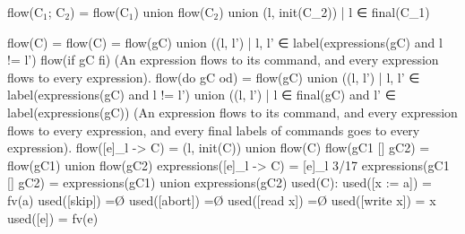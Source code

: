 \newline
\newline
flow(C$_1$; C$_2$)        = flow(C$_1$) union flow(C$_2$) union { (l, init(C_2)) | l ∈ final(C_1) }

\newline
\newline
\newline

flow({C})               = flow(C)
                        = flow(gC) union { ((l, l') | l, l' ∈ label(expressions(gC) and l != l') }
flow(if gC fi)
         (An expression flows to its command,
         and every expression flows to every expression).
flow(do gC od)          = flow(gC) union
                          { ((l, l') | l, l' ∈ label(expressions(gC) and l != l') } union
                          { ((l, l') | l ∈ final(gC) and l' ∈ label(expressions(gC)) }
         (An expression flows to its command,
         and every expression flows to every expression,
         and every final labels of commands goes to every expression).
flow([e]_l -> C)        = {(l, init(C))} union flow(C)
flow(gC1 [] gC2)        = flow(gC1) union flow(gC2)
expressions([e]_l -> C)          = {[e]_l}
                                                                                                   3/17
expressions(gC1 [] gC2)      = expressions(gC1) union expressions(gC2)
used(C):
used([x := a])       = fv(a)
used([skip])         =Ø
used([abort])        =Ø
used([read x])       =Ø
used([write x])      = {x}
used([e])            = fv(e)

